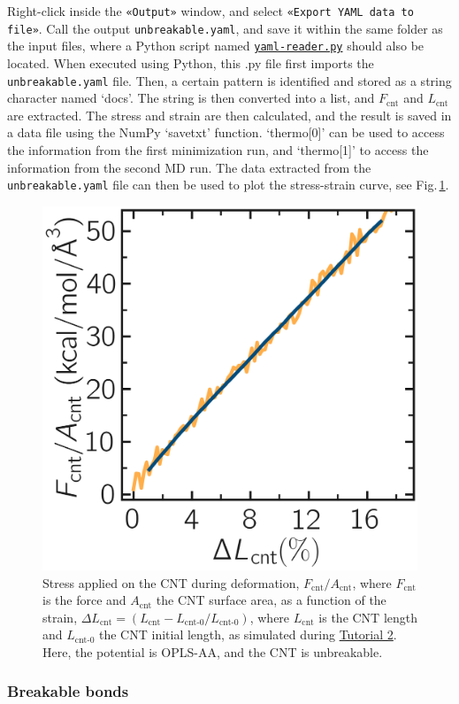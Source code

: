 \documentclass[9pt,tutorial]{livecoms}
\newcommand{\flecmd}[1]{\textcolor{command}{\texttt{#1}}} %
\newcommand{\guicmd}[1]{\textcolor{command}{\texttt{«#1»}}} %
\newcommand{\dwlcmd}[1]{\textcolor{download}{\texttt{#1}}} %
\newcommand{\filepath}{https://raw.githubusercontent.com/lammpstutorials/lammpstutorials-article/main/files/}
\begin{document}
Right-click inside the \guicmd{Output} window, and select
\guicmd{Export YAML data to file}.  Call the output \flecmd{unbreakable.yaml}, and save
it within the same folder as the input files, where a Python script named
\href{\filepath tutorial2/yaml-reader.py}{\dwlcmd{yaml-reader.py}} should also
be located.  When executed using Python, this .py file first imports
the \flecmd{unbreakable.yaml} file.  Then, a certain pattern is
identified and stored as a string character named `docs'.  The string is
then converted into a list, and $F_\text{cnt}$ and $L_\text{cnt}$
are extracted.  The stress and strain
are then calculated, and the result is saved in a data file using the
NumPy `savetxt' function.  `thermo[0]' can be used to access the
information from the first minimization run, and `thermo[1]' to access the
information from the second MD run.  The data extracted from
the \flecmd{unbreakable.yaml} file can then be used to plot the stress-strain
curve, see Fig.\,\ref{fig:CNT-stress-strain-unbreakable}.

\begin{figure}
\centering
\includegraphics[width=0.55\linewidth]{CNT-unbreakable-stress-strain}
\caption{Stress applied on the CNT during deformation, $F_\text{cnt}/A_\text{cnt}$,
where $F_\text{cnt}$ is the force and $A_\text{cnt}$ the CNT surface area,
as a function of the strain, $\Delta L_\text{cnt} = (L_\text{cnt}-L_\text{cnt-0}/L_\text{cnt-0})$, where
$L_\text{cnt}$ is the CNT length and $L_\text{cnt-0}$ the CNT initial length,
as simulated during \hyperref[carbon-nanotube-label]{Tutorial 2}.
Here, the potential is OPLS-AA, and the CNT is unbreakable.}
\label{fig:CNT-stress-strain-unbreakable}
\end{figure}

\subsubsection{Breakable bonds}
\end{document}
